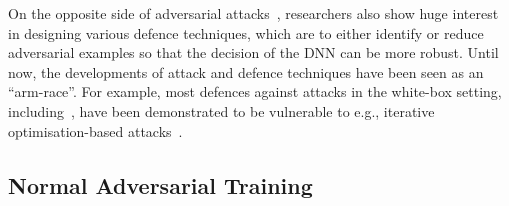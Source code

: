 
On the opposite side of adversarial attacks~\cite{biggio2013evasion, szegedy2014intriguing}, researchers also show huge interest in designing various defence techniques, which are to either identify or reduce adversarial examples so that the decision of the DNN can be more robust. Until now, the developments of attack and defence techniques have been seen as an ``arm-race''. For example, most defences against attacks in the white-box setting, including~\cite{hendrycks2016early,meng2017magnet,metzen2017detecting,papernot2016distillation}, have been demonstrated to be vulnerable to e.g., iterative optimisation-based attacks~\cite{carlini2017adversarial,carlini2017magnet}.





\subsection{Normal Adversarial Training}


